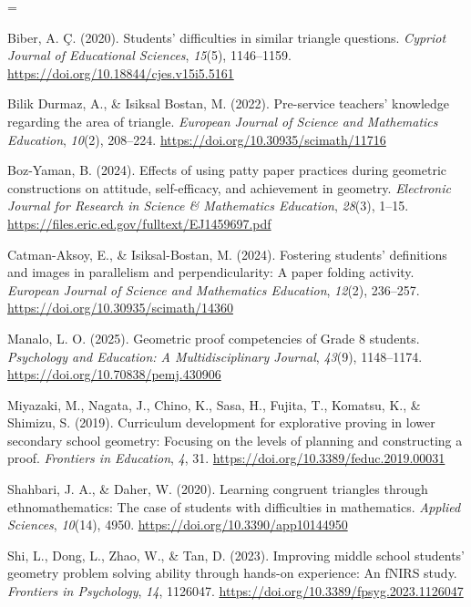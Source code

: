 \documentclass[a4paper,12pt]{article}
\begin{document}
{\TimesEn\linespread{1.0}\selectfont\fontsize{10.0pt}{14.4pt}\selectfont
\setlength{\parskip}{1.2pt}
\everypar={\hangindent=0.85cm }

Biber, A. \c{C}. (2020). Students' difficulties in similar triangle questions. \textit{Cypriot Journal of Educational Sciences}, \textit{15}(5), 1146--1159. \url{https://doi.org/10.18844/cjes.v15i5.5161}

Bilik Durmaz, A., \& Isiksal Bostan, M. (2022). Pre-service teachers' knowledge regarding the area of triangle. \textit{European Journal of Science and Mathematics Education}, \textit{10}(2), 208--224. \url{https://doi.org/10.30935/scimath/11716}

Boz-Yaman, B. (2024). Effects of using patty paper practices during geometric constructions on attitude, self-efficacy, and achievement in geometry. \textit{Electronic Journal for Research in Science \& Mathematics Education}, \textit{28}(3), 1--15. \url{https://files.eric.ed.gov/fulltext/EJ1459697.pdf}

Catman-Aksoy, E., \& Isiksal-Bostan, M. (2024). Fostering students' definitions and images in parallelism and perpendicularity: A paper folding activity. \textit{European Journal of Science and Mathematics Education}, \textit{12}(2), 236--257. \url{https://doi.org/10.30935/scimath/14360}

Manalo, L. O. (2025). Geometric proof competencies of Grade 8 students. \textit{Psychology and Education: A Multidisciplinary Journal}, \textit{43}(9), 1148--1174. \url{https://doi.org/10.70838/pemj.430906}

Miyazaki, M., Nagata, J., Chino, K., Sasa, H., Fujita, T., Komatsu, K., \& Shimizu, S. (2019). Curriculum development for explorative proving in lower secondary school geometry: Focusing on the levels of planning and constructing a proof. \textit{Frontiers in Education}, \textit{4}, 31. \url{https://doi.org/10.3389/feduc.2019.00031}

Shahbari, J. A., \& Daher, W. (2020). Learning congruent triangles through ethnomathematics: The case of students with difficulties in mathematics. \textit{Applied Sciences}, \textit{10}(14), 4950. \url{https://doi.org/10.3390/app10144950}

Shi, L., Dong, L., Zhao, W., \& Tan, D. (2023). Improving middle school students' geometry problem solving ability through hands-on experience: An fNIRS study. \textit{Frontiers in Psychology}, \textit{14}, 1126047. \url{https://doi.org/10.3389/fpsyg.2023.1126047}

}
\end{document}
